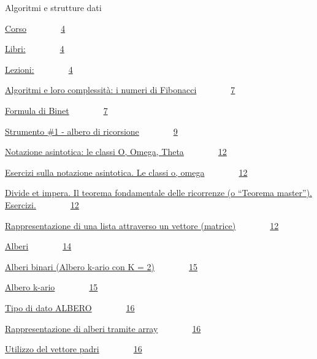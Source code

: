 \documentclass{article}
\date{}
\begin{document}
{}

{Algoritmi e strutture dati}

{\protect\hyperlink{h.h3wcjgbw0vzs}{Corso}}{~~~~~~~~}{\protect\hyperlink{h.h3wcjgbw0vzs}{4}}

{\protect\hyperlink{h.h56evxq8lcvu}{Libri:}}{~~~~~~~~}{\protect\hyperlink{h.h56evxq8lcvu}{4}}

{\protect\hyperlink{h.56skrlxpqr7c}{Lezioni:}}{~~~~~~~~}{\protect\hyperlink{h.56skrlxpqr7c}{4}}

{\protect\hyperlink{h.erye91slvrba}{Algoritmi e loro complessità: i
numeri di Fibonacci}}{~~~~~~~~}{\protect\hyperlink{h.erye91slvrba}{7}}

{\protect\hyperlink{h.uo8t8gg7vdaw}{Formula di
Binet}}{~~~~~~~~}{\protect\hyperlink{h.uo8t8gg7vdaw}{7}}

{\protect\hyperlink{h.x4ciu865ga1f}{Strumento \#1 - albero di
ricorsione}}{~~~~~~~~}{\protect\hyperlink{h.x4ciu865ga1f}{9}}

{\protect\hyperlink{h.jkxlloc1lefg}{Notazione asintotica: le classi O,
Omega, Theta}}{~~~~~~~~}{\protect\hyperlink{h.jkxlloc1lefg}{12}}

{\protect\hyperlink{h.tn5j57miv2l8}{Esercizi sulla notazione asintotica.
Le classi o, omega}}{~~~~~~~~}{\protect\hyperlink{h.tn5j57miv2l8}{12}}

{\protect\hyperlink{h.qp9ilz1tito1}{Divide et impera. Il teorema
fondamentale delle ricorrenze (o ``Teorema master'').
Esercizi.}}{~~~~~~~~}{\protect\hyperlink{h.qp9ilz1tito1}{12}}

{\protect\hyperlink{h.a5tr7osf4zwh}{Rappresentazione di una lista
attraverso un vettore
(matrice)}}{~~~~~~~~}{\protect\hyperlink{h.a5tr7osf4zwh}{12}}

{\protect\hyperlink{h.rgokfftftjlb}{Alberi}}{~~~~~~~~}{\protect\hyperlink{h.rgokfftftjlb}{14}}

{\protect\hyperlink{h.rmzlh8kpnju}{Alberi binari (Albero k-ario con K =
2)}}{~~~~~~~~}{\protect\hyperlink{h.rmzlh8kpnju}{15}}

{\protect\hyperlink{h.chua2o837in5}{Albero
k-ario}}{~~~~~~~~}{\protect\hyperlink{h.chua2o837in5}{15}}

{\protect\hyperlink{h.8kg49eb4dpz1}{Tipo di dato
ALBERO}}{~~~~~~~~}{\protect\hyperlink{h.8kg49eb4dpz1}{16}}

{\protect\hyperlink{h.ueuovjwdu9zj}{Rappresentazione di alberi tramite
array}}{~~~~~~~~}{\protect\hyperlink{h.ueuovjwdu9zj}{16}}

{\protect\hyperlink{h.nrzs3ooed9o}{Utilizzo del vettore
padri}}{~~~~~~~~}{\protect\hyperlink{h.nrzs3ooed9o}{16}}
\end{document}

